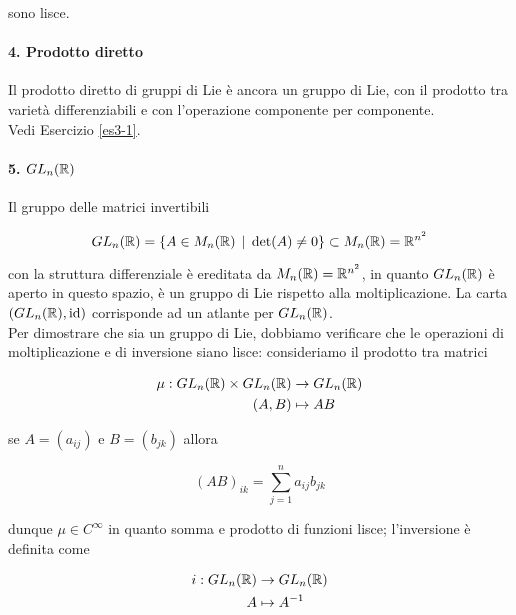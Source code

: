 sono lisce.

\paragraph{4. Prodotto diretto}

Il prodotto diretto di gruppi di Lie è ancora un gruppo di Lie, con il prodotto tra varietà differenziabili e con l'operazione componente per componente.\\
Vedi Esercizio \ref{es3-1}.

\paragraph{5. $ GL_{n}(\mathbb{R}) $}

Il gruppo delle matrici invertibili

\begin{equation}
	GL_{n}(\mathbb{R}) = \{ A \in M_{n}(\mathbb{R}) \, \mid \, \det(A) \neq 0 \} \subset M_{n}(\mathbb{R}) = \mathbb{R}^{n^{2}}
\end{equation}

con la struttura differenziale è ereditata da $ M_{n}(\mathbb{R}) = \mathbb{R}^{n^{2}} $, in quanto $ GL_{n}(\mathbb{R}) $ è aperto in questo spazio, è un gruppo di Lie rispetto alla moltiplicazione. La carta $ (GL_{n}(\mathbb{R}),\operatorname{id}) $ corrisponde ad un atlante per $ GL_{n}(\mathbb{R}) $.\\
Per dimostrare che sia un gruppo di Lie, dobbiamo verificare che le operazioni di moltiplicazione e di inversione siano lisce: consideriamo il prodotto tra matrici

\begin{align}
	\begin{split}
		\mu : GL_{n}(\mathbb{R}) \times GL_{n}(\mathbb{R}) &\to GL_{n}(\mathbb{R})\\
		(A,B) &\mapsto A B
	\end{split}
\end{align}

se $ A = (a_{ij}) $ e $ B = (b_{jk}) $ allora

\begin{equation}
	(A B)_{ik} = \sum_{j=1}^{n} a_{ij} b_{jk}
\end{equation}

dunque $ \mu \in C^{\infty} $ in quanto somma e prodotto di funzioni lisce; l'inversione è definita come

\begin{align}
	\begin{split}
		i : GL_{n}(\mathbb{R}) &\to GL_{n}(\mathbb{R})\\
		A &\mapsto A^{-1}
	\end{split}
\end{align}

